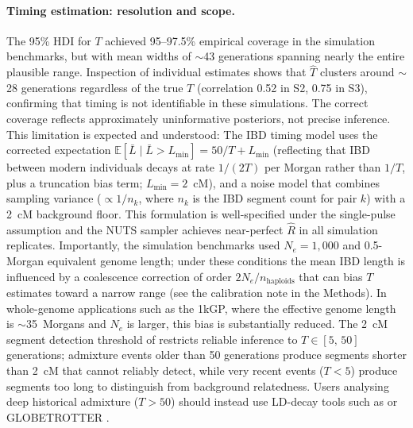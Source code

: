 \paragraph{Timing estimation: resolution and scope.}
The 95\% HDI for $T$ achieved 95--97.5\% empirical coverage in the
simulation benchmarks, but with mean widths of $\sim$43 generations
spanning nearly the entire plausible range.
Inspection of individual estimates shows that $\hat{T}$ clusters around
$\sim$28 generations regardless of the true $T$ (correlation 0.52 in S2,
0.75 in S3), confirming that timing is not identifiable in these simulations.
The correct coverage reflects approximately uninformative posteriors,
not precise inference.
This limitation is expected and understood:
The IBD timing model uses the corrected expectation
$\mathbb{E}[\bar{L} \mid \bar{L} > L_{\min}] = 50/T + L_{\min}$
(reflecting that IBD between modern individuals decays at rate $1/(2T)$ per
Morgan rather than $1/T$, plus a truncation bias term; $L_{\min} = 2$~cM),
and a noise model that combines sampling variance ($\propto 1/n_k$, where
$n_k$ is the IBD segment count for pair $k$) with a 2~cM background floor.
This formulation is well-specified under the single-pulse assumption and
the NUTS sampler achieves near-perfect $\hat{R}$ in all simulation replicates.
Importantly, the simulation benchmarks used $N_e = 1{,}000$ and 0.5-Morgan
equivalent genome length; under these conditions the mean IBD length is
influenced by a coalescence correction of order $2N_e / n_{\text{haploids}}$
that can bias $T$ estimates toward a narrow range
(see the calibration note in the Methods).
In whole-genome applications such as the 1kGP, where the effective genome
length is $\sim$35~Morgans and $N_e$ is larger, this bias is substantially
reduced.
The 2~cM segment detection threshold of \hapibd{} \citep{Browning2020}
restricts reliable inference to $T \in [5,\, 50]$ generations; admixture
events older than 50 generations produce segments shorter than 2~cM that
\hapibd{} cannot reliably detect, while very recent events ($T < 5$) produce
segments too long to distinguish from background relatedness.
Users analysing deep historical admixture ($T > 50$) should instead
use LD-decay tools such as \alder{} \citep{Loh2013} or
\textsc{GLOBETROTTER} \citep{Hellenthal2014}.

